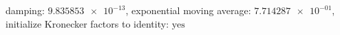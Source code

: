 damping: $\num[scientific-notation=true]{9.835853e-13}$, exponential moving average: $\num[scientific-notation=true]{7.714287e-01}$, initialize Kronecker factors to identity: $\text{yes}$